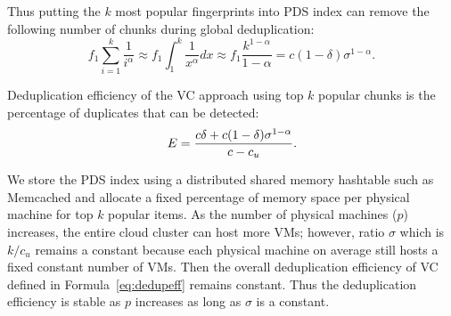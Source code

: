 Thus putting the $k$ most popular fingerprints into PDS index can remove the following number of chunks during global 
deduplication:
\[
f_1 \sum_{i=1}^{k}\frac{1}{i^\alpha} \approx  
f_1 \int_{1}^{k}\frac{1}{x^\alpha} dx  \approx  f_1\frac{  k^{1-\alpha}} {1-\alpha}
=c(1-\delta) \sigma^{1-\alpha}.
\]

Deduplication efficiency of the VC approach using top $k$ popular chunks
is the percentage of duplicates that can be detected:  
\begin{equation}
\label{eq:dedupeff}
E=\frac{ c\delta + c(1-\delta) \sigma^{1-\alpha}}
{c  - c_u }.\\
\end{equation}


We store the PDS index using a distributed shared memory hashtable such as Memcached
and allocate a fixed percentage of memory space per physical machine for top $k$ popular items.
As the number of physical machines ($p$) increases,
the entire cloud cluster can host more VMs; however,  ratio $\sigma$ which is $k/c_u$ remains
a constant because each physical machine on average still hosts a fixed constant number of 
VMs. Then the overall deduplication efficiency of VC defined in Formula~\ref{eq:dedupeff}
remains constant.
Thus the deduplication efficiency is stable  as $p$ increases as long as $\sigma$  is a constant.


